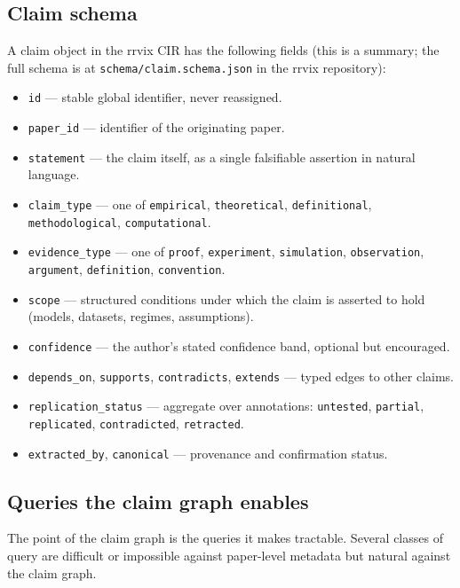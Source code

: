 \documentclass[11pt]{rrvix}
\begin{document}
\subsection{Claim schema}

A claim object in the rrvix CIR has the following fields (this is a summary; the full schema is at \texttt{schema/claim.schema.json} in the rrvix repository):

\begin{itemize}[leftmargin=2em]
\item \texttt{id} --- stable global identifier, never reassigned.
\item \texttt{paper\_id} --- identifier of the originating paper.
\item \texttt{statement} --- the claim itself, as a single falsifiable assertion in natural language.
\item \texttt{claim\_type} --- one of \texttt{empirical}, \texttt{theoretical}, \texttt{definitional}, \texttt{methodological}, \texttt{computational}.
\item \texttt{evidence\_type} --- one of \texttt{proof}, \texttt{experiment}, \texttt{simulation}, \texttt{observation}, \texttt{argument}, \texttt{definition}, \texttt{convention}.
\item \texttt{scope} --- structured conditions under which the claim is asserted to hold (models, datasets, regimes, assumptions).
\item \texttt{confidence} --- the author's stated confidence band, optional but encouraged.
\item \texttt{depends\_on}, \texttt{supports}, \texttt{contradicts}, \texttt{extends} --- typed edges to other claims.
\item \texttt{replication\_status} --- aggregate over annotations: \texttt{untested}, \texttt{partial}, \texttt{replicated}, \texttt{contradicted}, \texttt{retracted}.
\item \texttt{extracted\_by}, \texttt{canonical} --- provenance and confirmation status.
\end{itemize}

\subsection{Queries the claim graph enables}

The point of the claim graph is the queries it makes tractable. Several classes of query are difficult or impossible against paper-level metadata but natural against the claim graph.
\end{document}
